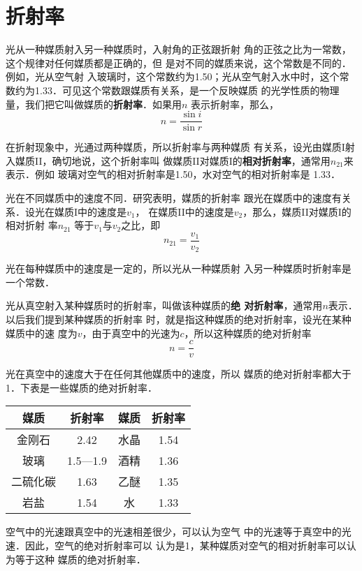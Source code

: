 \section{折射率} 
    光从一种媒质射入另一种媒质时，入射角的正弦跟折射
    角的正弦之比为一常数，这个规律对任何媒质都是正确的，但
    是对不同的媒质来说，这个常数是不同的．例如，光从空气射
    入玻璃时，这个常数约为1.50；光从空气射入水中时，这个常
    数约为1.33．可见这个常数跟媒质有关系，是一个反映媒质
    的光学性质的物理量，我们把它叫做媒质的\textbf{折射率}．如果用$n$
    表示折射率，那么，
    \[n=\frac{\sin i}{\sin r}\]

    在折射现象中，光通过两种媒质，所以折射率与两种媒质
    有关系，设光由媒质I射入媒质II，确切地说，这个折射率叫
    做媒质II对媒质I的\textbf{相对折射率}，通常用$n_{21}$来表示．例如
    玻璃对空气的相对折射率是1.50，水对空气的相对折射率是
    1.33．

    光在不同媒质中的速度不同．研究表明，媒质的折射率
    跟光在媒质中的速度有关系．设光在媒质I中的速度是$v_1$，
    在媒质II中的速度是$v_2$，那么，媒质II对媒质I的相对折射
    率$n_{21}$
    等于$v_1$与$v_2$之比，即
\[n_{21}=\frac{v_1}{v_2} \]

    光在每种媒质中的速度是一定的，所以光从一种媒质射
    入另一种媒质时折射率是一个常数．

    光从真空射入某种媒质时的折射率，叫做该种媒质的\textbf{绝
    对折射率}，通常用$n$表示．以后我们提到某种媒质的折射率
    时，就是指这种媒质的绝对折射率，设光在某种媒质中的速
    度为$v$，由于真空中的光速为$c$，所以这种媒质的绝对折射率
\[n=\frac{c}{v} \]

    光在真空中的速度大于在任何其他媒质中的速度，所以
    媒质的绝对折射率都大于1．下表是一些媒质的绝对折射率．
    \begin{center}
        \begin{tabular}{cccc}
        \hline
            媒质 & 折射率 & 媒质 & 折射率\\
        \hline
  金刚石  &  2.42 &  水晶   & 1.54\\
  玻璃   &   1.5—1.9  &  酒精  &  1.36\\
  二硫化碳  & 1.63  &  乙醚  &  1.35\\
  岩盐  &  1.54  &  水   &  1.33\\ 
        \hline
            \end{tabular}
        \end{center}

空气中的光速跟真空中的光速相差很少，可以认为空气
中的光速等于真空中的光速．因此，空气的绝对折射率可以
认为是1，某种媒质对空气的相对折射率可以认为等于这种
媒质的绝对折射率．


